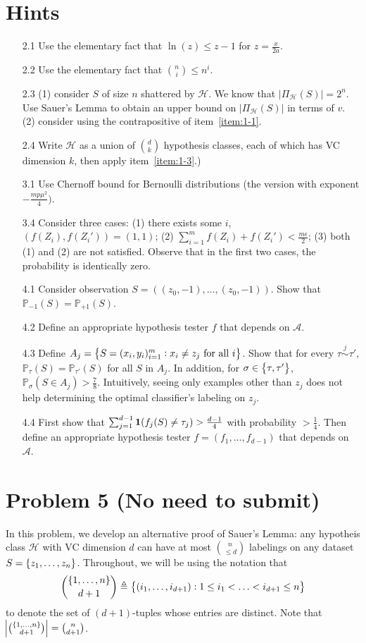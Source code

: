 \documentclass{article}
\newcommand{\PP}{\mathbb{P}} %
\newcommand{\Acal}{\mathcal{A}} %
\newcommand{\Hcal}{\mathcal{H}} %
\newcommand{\defeq}{\triangleq}
\newcommand*{\one}{{\bf 1}}
\begin{document}
\section*{Hints}
\begin{enumerate}
  \item[2.1] Use the elementary fact that $\ln(z) \leq z - 1$ for $z = \frac{x}{2a}$.
  \item[2.2] Use the elementary fact that ${n \choose i} \leq n^i$.
  \item[2.3] (1) consider $S$ of size $n$ shattered by $\Hcal$. We know that
  $|\Pi_\Hcal(S)| = 2^n$.
  Use Sauer's Lemma to obtain an upper bound on $|\Pi_\Hcal(S)|$ in terms of $v$. (2)
  consider using the contrapositive of item~\ref{item:1-1}.
  \item[2.4] Write $\Hcal$ as a union of $d \choose k$ hypothesis classes, each of which has VC dimension $k$, then apply item~\ref{item:1-3}.)
  \item[3.1] Use Chernoff bound for Bernoulli distributions (the version with exponent $-\frac{m p\mu^2}{4})$.
  \item[3.4] Consider three cases: (1) there exists some $i$, $(f(Z_i), f(Z_i')) = (1,1)$; (2) $\sum_{i=1}^m f(Z_i) + f(Z_i') < \frac{m\epsilon}{2}$; (3) both (1) and (2) are not satisfied. Observe that in the first two cases, the probability is identically zero.

  \item[4.1] Consider observation $S = ((z_0,-1), \ldots, (z_0,-1))$. Show that $\PP_{-1}(S) = \PP_{+1}(S)$.
  \item[4.2] Define an appropriate hypothesis tester $f$ that depends on $\Acal$.
  \item[4.3] Define $A_j = \cbr{S = (x_i, y_i)_{i=1}^m: x_i \neq z_j \text{ for all } i}$. Show that for every $\tau \stackrel{j}{\sim} \tau'$, $\PP_{\tau}(S) = \PP_{\tau'}(S)$ for all $S$ in $A_j$. In addition, for
   $\sigma \in \cbr{\tau, \tau'}$, $\PP_\sigma(S \in A_j) > \frac78$. Intuitively,
  seeing only examples other than $z_j$ does not help determining the optimal classifier's labeling on $z_j$.
  \item[4.4] First show that $\sum_{j=1}^{d-1} \one(f_j(S) \neq \tau_j) > \frac{d-1}{4}$ with probability $> \frac14$. Then define an appropriate hypothesis tester $f = (f_1,\ldots,f_{d-1})$ that depends on $\Acal$.
\end{enumerate}


\section*{Problem 5 (No need to submit)}
In this problem, we develop an alternative proof of Sauer's Lemma: any hypotheis class $\Hcal$ with VC dimension $d$ can have at most ${n \choose {\leq d}}$ labelings
on any dataset $S = \cbr{z_1,\ldots,z_n}$. Throughout, we will be using the notation that
\[ {\cbr{1,\ldots,n} \choose d+1} \defeq \cbr{(i_1, \ldots, i_{d+1}): 1 \leq i_1 < \ldots < i_{d+1} \leq n} \]
to denote the set of $(d+1)$-tuples whose entries are distinct.
Note that $\abs{{\cbr{1,\ldots,n} \choose {d+1}}} = {n \choose {d+1}}$.
\end{document}
